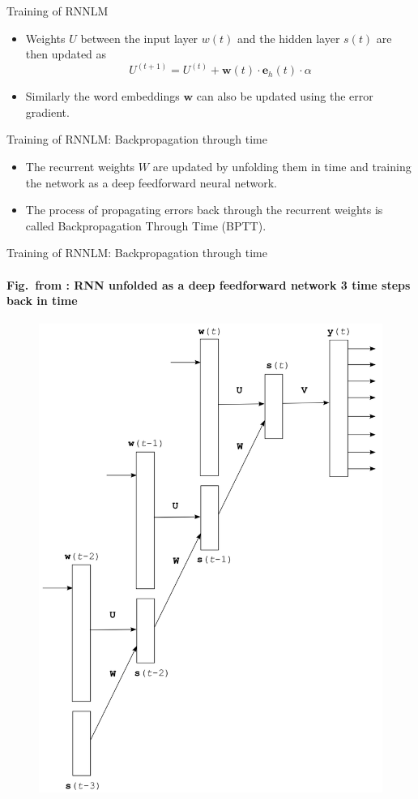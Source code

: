 \begin{frame}{Training of RNNLM}
\begin{itemize}[<+->]
	\item Weights $U$ between the input layer $w(t)$ and the hidden layer $s(t)$ are then updated as
	\[ U^{(t+1)} = U^{(t)} + \mathbf{w}(t) \cdot \mathbf{e}_h(t) \cdot \alpha \]
	\item Similarly the word embeddings $\mathbf{w}$ can also be updated using the error gradient.
\end{itemize}
\end{frame}

\begin{frame}{Training of RNNLM: Backpropagation through time}
\begin{itemize}[<+->]
	\item The recurrent weights $W$ are updated by unfolding them in time and training the network as a deep feedforward neural network.
	\item The process of propagating errors back through the recurrent weights is called Backpropagation Through Time (BPTT).
\end{itemize}
\end{frame}

\begin{frame}{Training of RNNLM: Backpropagation through time}
\framesubtitle{Fig.\ from \cite{Mikolov2010}: RNN unfolded as a deep feedforward network 3 time steps back in time}
\centering
\begin{figure}
\includegraphics[scale=0.25]{figures/nlm/rnn-bptt.png}
\end{figure}
\end{frame}

